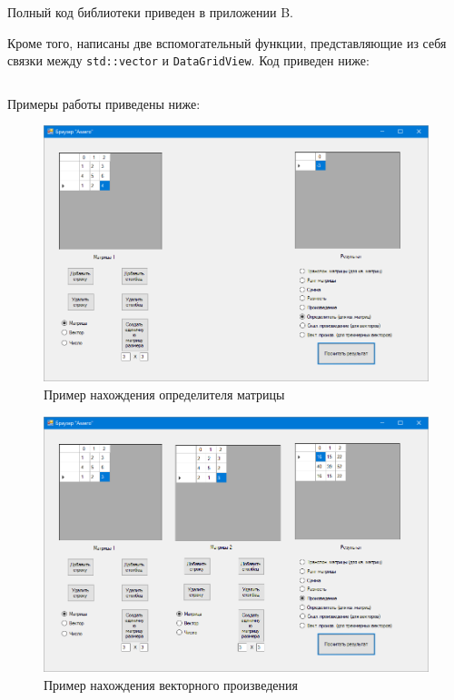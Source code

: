 Полный код библиотеки приведен в приложении B.

Кроме того, написаны две вспомогательный функции, представляющие из себя связки
между \verb|std::vector| и \verb|DataGridView|. Код приведен ниже:

\inputminted[fontsize=\small, breaklines=true, style=bw, linenos, encoding=cp1251, outencoding=utf8]{cpp}{task6/Misc.h}

Примеры работы приведены ниже:

\begin{figure}[H]
    \centering
    \includegraphics[scale=0.4]{task6/det.png}
    \caption{Пример нахождения определителя матрицы}
\end{figure}

\begin{figure}[H]
    \centering
    \includegraphics[scale=0.4]{task6/mult.png}   
    \caption{Пример нахождения векторного произведения}
\end{figure}

